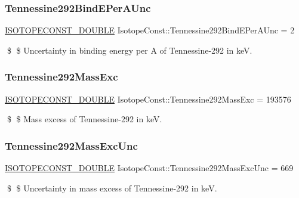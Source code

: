 \subsubsection{\texorpdfstring{Tennessine292\+Bind\+E\+Per\+A\+Unc}{Tennessine292BindEPerAUnc}}
{\footnotesize\ttfamily \mbox{\hyperlink{group___isotope_const-_macros_ga8f45a7272ce02c0b4c65c44636ed719a}{I\+S\+O\+T\+O\+P\+E\+C\+O\+N\+S\+T\+\_\+\+D\+O\+U\+B\+LE}} Isotope\+Const\+::\+Tennessine292\+Bind\+E\+Per\+A\+Unc = 2}

\$ \$ Uncertainty in binding energy per A of Tennessine-\/292 in keV. \mbox{\label{group___isotope_const-_tennessine-_ts292_gaf6e1e7d7ec1ad97b852b064c1b9a5702}} 
\subsubsection{\texorpdfstring{Tennessine292\+Mass\+Exc}{Tennessine292MassExc}}
{\footnotesize\ttfamily \mbox{\hyperlink{group___isotope_const-_macros_ga8f45a7272ce02c0b4c65c44636ed719a}{I\+S\+O\+T\+O\+P\+E\+C\+O\+N\+S\+T\+\_\+\+D\+O\+U\+B\+LE}} Isotope\+Const\+::\+Tennessine292\+Mass\+Exc = 193576}

\$ \$ Mass excess of Tennessine-\/292 in keV. \mbox{\label{group___isotope_const-_tennessine-_ts292_gabf83ceba5066b0ed7f730de27a8764c8}} 
\subsubsection{\texorpdfstring{Tennessine292\+Mass\+Exc\+Unc}{Tennessine292MassExcUnc}}
{\footnotesize\ttfamily \mbox{\hyperlink{group___isotope_const-_macros_ga8f45a7272ce02c0b4c65c44636ed719a}{I\+S\+O\+T\+O\+P\+E\+C\+O\+N\+S\+T\+\_\+\+D\+O\+U\+B\+LE}} Isotope\+Const\+::\+Tennessine292\+Mass\+Exc\+Unc = 669}

\$ \$ Uncertainty in mass excess of Tennessine-\/292 in keV. \mbox{\label{group___isotope_const-_tennessine-_ts292_gab413b33533e820e718083c01096446ab}} 
